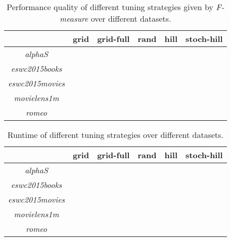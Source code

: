 \begin{table}[h!]
    \centering
    \begin{tabular}{| c | c | c | c | c | c | }
        \hline
        \textbf{}               & \textbf{grid} & \textbf{grid-full}    & \textbf{rand} & \textbf{hill} & \textbf{stoch-hill} \\ \hline


        \textit{alphaS}         &               &                       &               &               &                       \\ \hline
        \textit{eswc2015books}  &               &                       &               &               &                       \\ \hline
        \textit{eswc2015movies} &               &                       &               &               &                       \\ \hline
        \textit{movielens1m}    &               &                       &               &               &                       \\ \hline
        \textit{romeo}          &               &                       &               &               &                       \\ \hline


    \end{tabular}
    \caption{Performance quality of different tuning strategies given by \textit{F-measure} over different datasets.}
    \label{tab:katzeig_tuning_F1}
\end{table}

\begin{table}[h!]
    \centering
    \begin{tabular}{| c | c | c | c | c | c | }
        \hline
        \textbf{}               & \textbf{grid} & \textbf{grid-full}    & \textbf{rand} & \textbf{hill} & \textbf{stoch-hill} \\ \hline


        \textit{alphaS}         &               &                       &               &               &                       \\ \hline
        \textit{eswc2015books}  &               &                       &               &               &                       \\ \hline
        \textit{eswc2015movies} &               &                       &               &               &                       \\ \hline
        \textit{movielens1m}    &               &                       &               &               &                       \\ \hline
        \textit{romeo}          &               &                       &               &               &                       \\ \hline


    \end{tabular}
    \caption{Runtime of different tuning strategies over different datasets.}
    \label{tab:katzeig_tuning_sec}
\end{table}

